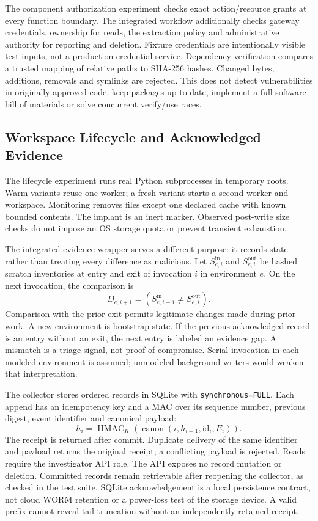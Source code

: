 \documentclass[11pt,a4paper]{article}
\begin{document}
The component authorization experiment checks exact action/resource grants at every function boundary. The integrated workflow additionally checks gateway credentials, ownership for reads, the extraction policy and administrative authority for reporting and deletion. Fixture credentials are intentionally visible test inputs, not a production credential service. Dependency verification compares a trusted mapping of relative paths to SHA-256 hashes. Changed bytes, additions, removals and symlinks are rejected. This does not detect vulnerabilities in originally approved code, keep packages up to date, implement a full software bill of materials or solve concurrent verify/use races.

\subsection{Workspace Lifecycle and Acknowledged Evidence}\label{sec:audit}
The lifecycle experiment runs real Python subprocesses in temporary roots. Warm variants reuse one worker; a fresh variant starts a second worker and workspace. Monitoring removes files except one declared cache with known bounded contents. The implant is an inert marker. Observed post-write size checks do not impose an OS storage quota or prevent transient exhaustion.

The integrated evidence wrapper serves a different purpose: it records state rather than treating every difference as malicious. Let $S_{e,i}^{\mathrm{in}}$ and $S_{e,i}^{\mathrm{out}}$ be hashed scratch inventories at entry and exit of invocation $i$ in environment $e$. On the next invocation, the comparison is
\[
D_{e,i+1} = \left(S_{e,i+1}^{\mathrm{in}} \ne S_{e,i}^{\mathrm{out}}\right).
\]
Comparison with the prior exit permits legitimate changes made during prior work. A new environment is bootstrap state. If the previous acknowledged record is an entry without an exit, the next entry is labeled an evidence gap. A mismatch is a triage signal, not proof of compromise. Serial invocation in each modeled environment is assumed; unmodeled background writers would weaken that interpretation.

The collector stores ordered records in SQLite with \texttt{synchronous=FULL}. Each append has an idempotency key and a MAC over its sequence number, previous digest, event identifier and canonical payload:
\[
h_i = \operatorname{HMAC}_K\!\left(\operatorname{canon}(i,h_{i-1},\mathrm{id}_i,E_i)\right).
\]
The receipt is returned after commit. Duplicate delivery of the same identifier and payload returns the original receipt; a conflicting payload is rejected. Reads require the investigator API role. The API exposes no record mutation or deletion. Committed records remain retrievable after reopening the collector, as checked in the test suite. SQLite acknowledgement is a local persistence contract, not cloud WORM retention or a power-loss test of the storage device. A valid prefix cannot reveal tail truncation without an independently retained receipt.
\end{document}
